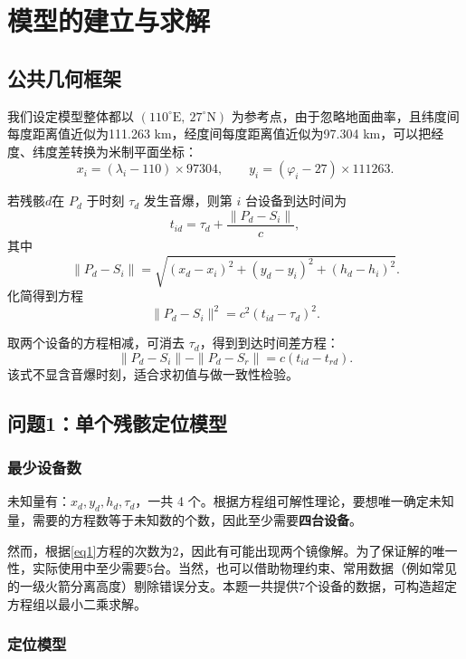 \documentclass[12pt,a4paper]{article}
\begin{document}
\section{模型的建立与求解}
 
\subsection{公共几何框架}

我们设定模型整体都以 $(110^\circ\mathrm{E},\ 27^\circ\mathrm{N})$ 为参考点，由于忽略地面曲率，且纬度间每度距离值近似为111.263 km，经度间每度距离值近似为97.304 km，可以把经度、纬度差转换为米制平面坐标：
\[
x_i=(\lambda_i-110)\times 97304,\qquad
y_i=(\varphi_i-27)\times 111263.
\]

若残骸$d$在 $P_d$ 于时刻 $\tau_d$ 发生音爆，则第 $i$ 台设备到达时间为
\[
t_{id}=\tau_d+\frac{\|P_d-S_i\|}{c},
\]
其中
\[
\|P_d-S_i\|=\sqrt{(x_d-x_i)^2+(y_d-y_i)^2+(h_d-h_i)^2}.
\]
化简得到方程
\begin{equation}
\|P_d-S_i\|^2=c^2\left(t_{id}-\tau_d\right)^2.
\end{equation}\label{eq1}

取两个设备的方程相减，可消去 $\tau_d$，得到到达时间差方程：
\[
\|P_d-S_i\|-\|P_d-S_r\|=c\left(t_{id}-t_{rd}\right).
\]
该式不显含音爆时刻，适合求初值与做一致性检验。

\subsection{问题1：单个残骸定位模型}

\subsubsection{最少设备数}

未知量有：$x_d,y_d,h_d,\tau_d$，一共 4 个。根据方程组可解性理论，要想唯一确定未知量，需要的方程数等于未知数的个数，因此至少需要\textbf{四台设备}。

 然而，根据\ref{eq1}方程的次数为2，因此有可能出现两个镜像解。为了保证解的唯一性，实际使用中至少需要5台。当然，也可以借助物理约束、常用数据（例如常见的一级火箭分离高度）剔除错误分支。本题一共提供7个设备的数据，可构造超定方程组以最小二乘求解。
\subsubsection{定位模型}
\end{document}
